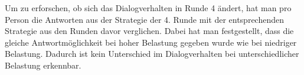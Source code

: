\documentclass[12pt,a4paper]{scrartcl}
\begin{document}
Um zu erforschen, ob sich das Dialogverhalten in Runde 4 ändert, hat man pro Person die Antworten aus der Strategie der 4. Runde mit der entsprechenden Strategie aus den Runden davor verglichen. Dabei hat man festgestellt, dass die gleiche Antwortmöglichkeit bei hoher Belastung gegeben wurde wie bei niedriger Belastung. Dadurch ist kein Unterschied im Dialogverhalten bei unterschiedlicher Belastung erkennbar. 

\end{document}
